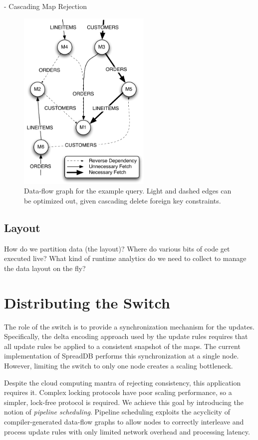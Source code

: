 \documentclass{sig-alternate}
\begin{document}
- Cascading Map Rejection

\begin{figure}
\begin{center}
\includegraphics[width=2.5in]{images/q12_graph.pdf}
\caption{Data-flow graph for the example query.  Light and dashed edges can be optimized out, given cascading delete foreign key constraints.}
\label{fig:dataflow}
\end{center}
\end{figure}

\subsection{Layout}
How do we partition data (the layout)?  Where do various bits of code get executed live?  What kind of runtime analytics do we need to collect to manage the data layout on the fly? 

\section{Distributing the Switch}
\label{sec:distswitch}
The role of the switch is to provide a synchronization mechanism for the updates.  Specifically, the delta encoding approach used by the update rules requires that all update rules be applied to a consistent snapshot of the maps.  The current implementation of SpreadDB performs this synchronization at a single node.  However, limiting the switch to only one node creates a scaling bottleneck.  

Despite the cloud computing mantra of rejecting consistency, this application requires it.  Complex locking protocols have poor scaling performance, so a simpler, lock-free protocol is required.  We achieve this goal by introducing the notion of \textit{pipeline scheduling}.  Pipeline scheduling exploits the acyclicity of compiler-generated data-flow graphs to allow nodes to correctly interleave and process update rules with only limited network overhead and processing latency.
\end{document}
